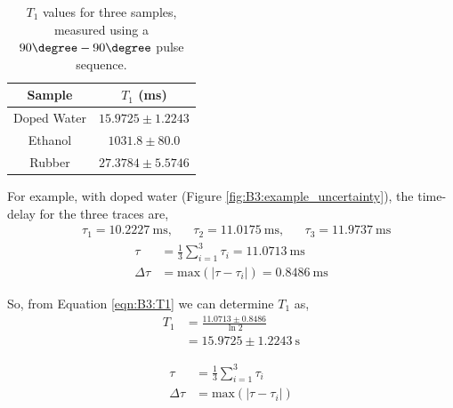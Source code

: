 \begin{table}[H]
    \centering
    \begin{tabular}{c|c}
    \toprule
        \textbf{Sample} & $T_1$ (ms) \\ \midrule
        {Doped Water} & $15.9725 \pm 1.2243$ \\
        {Ethanol} & $1031.8\pm 80.0$  \\
        {Rubber} & $27.3784 \pm 5.5746$ \\ \bottomrule
    \end{tabular}
    \caption{$T_1$ values for three samples, measured using a $90\degree-90\degree$ pulse sequence.}
    \label{tab:B3:T1values}
\end{table}


For example, with doped water (Figure \ref{fig:B3:example_uncertainty}), the time-delay for the three traces are,
\begin{align*}
    &\tau_1 = 10.2227\ \text{ms}, & &\tau_2 = 11.0175\ \text{ms}, & &\tau_3 = 11.9737\ \text{ms}
\end{align*}
\begin{align*}
    \tau &=  \frac{1}{3} \sum_{i=1}^3 \tau_i = 11.0713\ \text{ms} \\
    \Delta\tau &= \text{max}\left( |\tau - \tau_i | \right) = 0.8486 \ \text{ms}
\end{align*}


So, from Equation \ref{eqn:B3:T1} we can determine $T_1$ as,
\begin{align*}
    T_1 &= \frac{11.0713\pm0.8486}{\ln 2} \\
    &= 15.9725 \pm 1.2243 \ \text{s}
\end{align*}


\begin{align*}
    \tau &= \frac{1}{3} \sum_{i=1}^3 \tau_i\\
    \Delta \tau &= \text{max}\left( |\tau - \tau_i | \right)
\end{align*}
